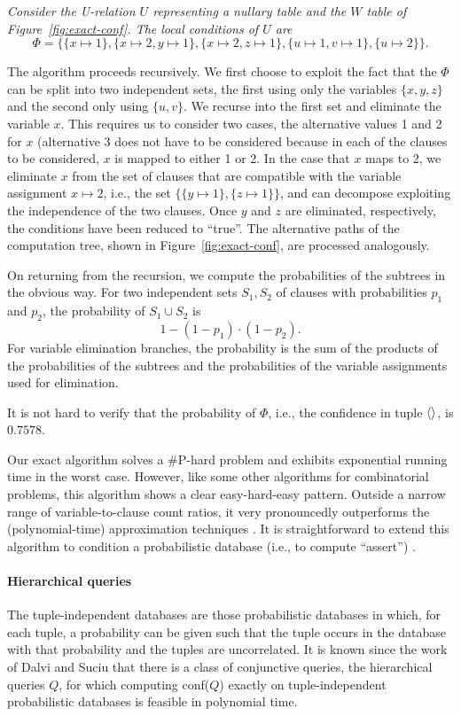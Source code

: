\begin{example}\em
Consider the U-relation $U$ representing a nullary table and
the $W$ table of Figure~\ref{fig:exact-conf}.
The local conditions of $U$ are
\[
\Phi = \{ \{x\mapsto 1\}, \{x\mapsto 2, y\mapsto 1\}, \{x\mapsto 2, z\mapsto 1\},
   \{u\mapsto 1, v\mapsto 1\}, \{u\mapsto 2\} \}.
\]

The algorithm proceeds recursively. We first choose to exploit the fact that the $\Phi$ can be split into two independent sets, the first using only the variables $\{x, y, z\}$ and the second only using $\{u,v\}$.
We recurse into the first set and eliminate the variable $x$. This requires us to consider two cases, the alternative values 1 and 2 for $x$ (alternative 3 does not have to be considered because in each of the clauses to be considered, $x$ is mapped to either 1 or 2. In the case that $x$ maps to 2, we eliminate $x$ from the set of clauses that are compatible with the variable assignment $x \mapsto 2$, i.e., the set
$\{\{y\mapsto 1\}, \{z\mapsto 1\} \}$, and
can decompose exploiting the independence of the two clauses. Once $y$ and $z$ are eliminated, respectively, the conditions have been reduced to ``true''. The alternative paths of the computation tree, shown in Figure~\ref{fig:exact-conf}, are processed analogously.

On returning from the recursion, we compute the probabilities of the subtrees in the obvious way. For two independent sets $S_1, S_2$ of clauses with probabilities $p_1$ and $p_2$, the probability of $S_1 \cup S_2$ is
\[
1 - (1-p_1)\cdot(1-p_2).
\]
For variable elimination branches,
the probability is the sum of the products of the probabilities of the subtrees and the probabilities of the variable assignments used for elimination.

It is not hard to verify that the probability of $\Phi$, i.e., the confidence in tuple $\langle  \rangle$,
is $0.7578$.
\punto
\end{example}


Our exact algorithm solves a \#P-hard problem and exhibits exponential running time in the worst case. However, like some other algorithms for combinatorial problems, this algorithm shows a clear easy-hard-easy pattern. Outside a narrow range of variable-to-clause count ratios, it very pronouncedly outperforms the (polynomial-time) approximation techniques \cite{KO2008}.
It is straightforward to extend this algorithm to condition a probabilistic database (i.e., to compute ``assert'') \cite{KO2008}.


\paragraph{Hierarchical queries}
The tuple-independent databases are those probabilistic databases in
which, for each tuple, a probability can be given such that the tuple
occurs in the database with that probability and the tuples are
uncorrelated. It is known since the work of Dalvi and Suciu
\cite{dalvi07efficient} that there is a class of conjunctive queries,
the hierarchical queries $Q$, for which computing conf($Q$) exactly on
tuple-independent probabilistic databases is feasible in polynomial
time.

